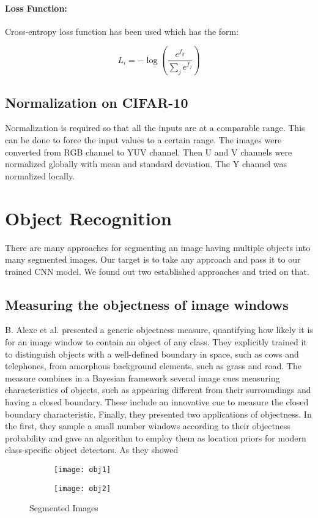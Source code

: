  
 \paragraph{Loss Function:}
 Cross-entropy loss function has been used which has the form:
 
 
$$ L_{i} = -\log{(\frac{e^{f_y}}{\sum_j{e^{f_j}}})}$$

\subsection{Normalization on CIFAR-10}

Normalization is required so that all the inputs are at a comparable range. This can be done to force the input values to a certain range. The images were converted from RGB channel to YUV channel. Then U and V channels were normalized globally with mean and standard deviation. The Y channel was normalized locally.

\section{Object Recognition}
There are many approaches for segmenting an image having multiple objects into many segmented images. Our target is to take any approach and pass it to our trained CNN model. We found out two established approaches and tried on that.

\subsection{Measuring the objectness of image windows}
B. Alexe et al. \cite{1} presented a generic objectness measure, quantifying how likely it is for an image window to contain an object of any
class. They explicitly trained it to distinguish objects with a well-defined boundary in space, such as cows and telephones, from amorphous
background elements, such as grass and road. The measure combines in a Bayesian framework several image cues measuring
characteristics of objects, such as appearing different from their surroundings and having a closed boundary. These include an
innovative cue to measure the closed boundary characteristic. Finally, they presented two applications of objectness. In the first, they sample a small number windows according to their
objectness probability and gave an algorithm to employ them as location priors for modern class-specific object detectors. As they showed

\begin{figure}[ht] 
  \begin{subfigure}[b]{0.5\linewidth}
    \centering
    \texttt{[image: obj1]}
    \caption{} 
    \label{obj1} 
    \vspace{4ex}
  \end{subfigure}%
  \begin{subfigure}[b]{0.5\linewidth}
    \centering
    \texttt{[image: obj2]}
    \caption{} 
    \label{obj2} 
    \vspace{4ex}
  \end{subfigure}%
  \caption{Segmented Images}
  \label{objectnessfig} 
\end{figure}

